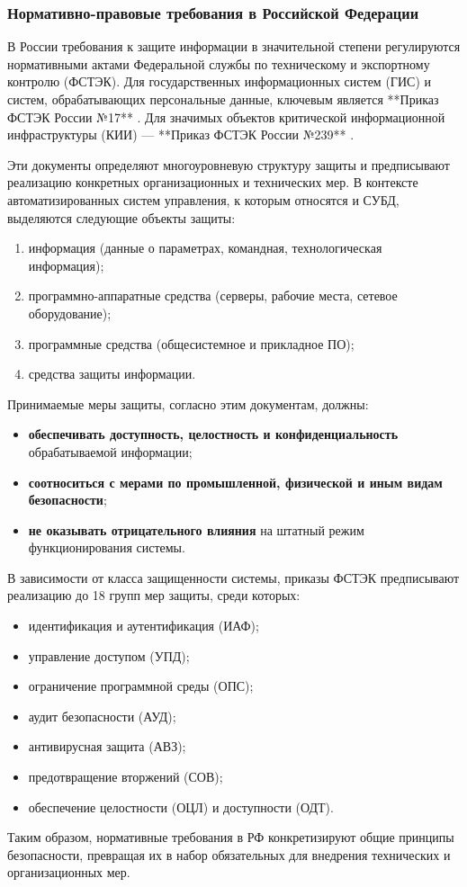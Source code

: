 \subsubsection{Нормативно-правовые требования в Российской Федерации}
В России требования к защите информации в значительной степени регулируются нормативными актами Федеральной службы по техническому и экспортному контролю (ФСТЭК). Для государственных информационных систем (ГИС) и систем, обрабатывающих персональные данные, ключевым является **Приказ ФСТЭК России №17** \autocite{fstec17}. Для значимых объектов критической информационной инфраструктуры (КИИ) — **Приказ ФСТЭК России №239** \autocite{FSTEKOBKIS}.

Эти документы определяют многоуровневую структуру защиты и предписывают реализацию конкретных организационных и технических мер. В контексте автоматизированных систем управления, к которым относятся и СУБД, выделяются следующие объекты защиты:
\begin{enumerate}
	\item информация (данные о параметрах, командная, технологическая информация);
	\item программно-аппаратные средства (серверы, рабочие места, сетевое оборудование);
	\item программные средства (общесистемное и прикладное ПО);
	\item средства защиты информации.
\end{enumerate}

Принимаемые меры защиты, согласно этим документам, должны:
\begin{itemize}
    \item \textbf{обеспечивать доступность, целостность и конфиденциальность} обрабатываемой информации;
    \item \textbf{соотноситься с мерами по промышленной, физической и иным видам безопасности};
    \item \textbf{не оказывать отрицательного влияния} на штатный режим функционирования системы.
\end{itemize}

В зависимости от класса защищенности системы, приказы ФСТЭК предписывают реализацию до 18 групп мер защиты, среди которых:
\begin{itemize}
    \item идентификация и аутентификация (ИАФ);
    \item управление доступом (УПД);
    \item ограничение программной среды (ОПС);
    \item аудит безопасности (АУД);
    \item антивирусная защита (АВЗ);
    \item предотвращение вторжений (СОВ);
    \item обеспечение целостности (ОЦЛ) и доступности (ОДТ).
\end{itemize}
Таким образом, нормативные требования в РФ конкретизируют общие принципы безопасности, превращая их в набор обязательных для внедрения технических и организационных мер.

